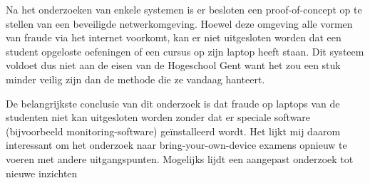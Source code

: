 Na het onderzoeken van enkele systemen is er besloten een proof-of-concept op te stellen van een beveiligde netwerkomgeving. Hoewel deze omgeving alle vormen van fraude via het internet voorkomt, kan er niet uitgesloten worden dat een student opgeloste oefeningen of een cursus op zijn laptop heeft staan. Dit systeem voldoet dus niet aan de eisen van de Hogeschool Gent want het zou een stuk minder veilig zijn dan de methode die ze vandaag hanteert. 

De belangrijkste conclusie van dit onderzoek is dat fraude op laptops van de studenten niet kan uitgesloten worden zonder dat er speciale software (bijvoorbeeld monitoring-software) ge\"{i}nstalleerd wordt. Het lijkt mij daarom interessant om het onderzoek naar bring-your-own-device examens opnieuw te voeren met andere uitgangspunten. Mogelijks lijdt een aangepast onderzoek tot nieuwe inzichten

